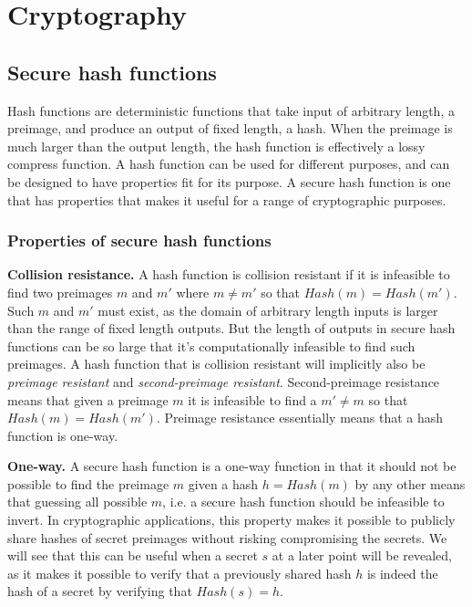 \section{Cryptography}
\label{sec:cryptography}

\subsection{Secure hash functions}

Hash functions are deterministic functions that take input of arbitrary length, a preimage, and produce an output of fixed length, a hash. When the preimage is much larger than the output length, the hash function is effectively a lossy compress function. A hash function can be used for different purposes, and can be designed to have properties fit for its purpose. A secure hash function is one that has properties that makes it useful for a range of cryptographic purposes. 

\subsubsection{Properties of secure hash functions}

{\bf Collision resistance.}
A hash function is collision resistant if it is infeasible to find two preimages $m$ and $m'$ where $m \neq m'$ so that $Hash(m) = Hash(m')$. Such $m$ and $m'$ must exist, as the domain of arbitrary length inputs is larger than the range of fixed length outputs. But the length of outputs in secure hash functions can be so large that it's computationally infeasible to find such preimages. 
A hash function that is collision resistant will implicitly also be \emph{preimage resistant} and \emph{second-preimage resistant}. Second-preimage resistance means that given a preimage $m$ it is infeasible to find a $m' \neq m$ so that $Hash(m) = Hash(m')$. Preimage resistance essentially means that a hash function is one-way.

{\bf One-way.}
A secure hash function is a one-way function in that it should not be possible to find the preimage $m$ given a hash $h = Hash(m)$ by any other means that guessing all possible $m$, i.e. a secure hash function should be infeasible to invert. In cryptographic applications, this property makes it possible to publicly share hashes of secret preimages without risking compromising the secrets. We will see that this can be useful when a secret $s$ at a later point will be revealed, as it makes it possible to verify that a previously shared hash $h$ is indeed the hash of a secret by verifying that $Hash(s) = h$.

